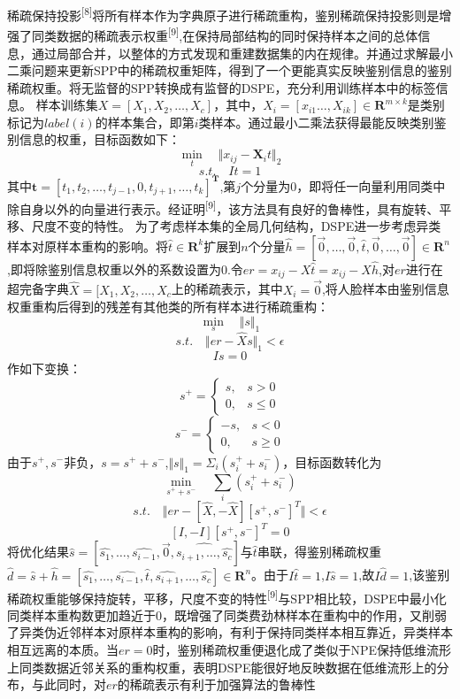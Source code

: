 \documentclass[bachelor,zhspacing]{cqu}  %
\begin{document}
稀疏保持投影\textsuperscript{{[}8{]}}将所有样本作为字典原子进行稀疏重构，鉴别稀疏保持投影则是增强了同类数据的稀疏表示权重\textsuperscript{{[}9{]}},在保持局部结构的同时保持样本之间的总体信息，通过局部合并，以整体的方式发现和重建数据集的内在规律。并通过求解最小二乘问题来更新SPP中的稀疏权重矩阵，得到了一个更能真实反映鉴别信息的鉴别稀疏权重。将无监督的SPP转换成有监督的DSPE，充分利用训练样本中的标签信息。
样本训练集\(X=[X_{1},X_{2},\ldots,X_{c}]\)，其中，\(X_{i}=[x_{i1}\ldots,X_{ik}]\in \mathbf{R}^{m\times k}\)是类别标记为\(label(i)\)的样本集合，即第\(i\)类样本。通过最小二乘法获得最能反映类别鉴别信息的权重，目标函数如下：
\[\min_{t}\quad\Vert x_{ij} - \mathbf{X}_{i}t\Vert_{2}\]
\[s.t.\quad It = 1\]
其中\(\mathbf{t}=[t_{1},t_{2},\ldots,t_{j-1},0,t_{j+1},\ldots,t_{k}]^{\mathbf{T}}\),第\(j\)个分量为0，即将任一向量利用同类中除自身以外的向量进行表示。经证明\textsuperscript{{[}9{]}}，该方法具有良好的鲁棒性，具有旋转、平移、尺度不变的特性。
为了考虑样本集的全局几何结构，DSPE进一步考虑异类样本对原样本重构的影响。将\(\hat{t}\in \mathbf{R}^k\)扩展到\(n\)个分量\(\hat{h}=[\vec{0},\ldots,\vec{0},\hat{t},\vec{0},\ldots,\vec{0}]\in \mathbf{R}^{n}\),即将除鉴别信息权重以外的系数设置为0.令\(er=x_{ij}-X\hat{t}=x_{ij}-X\hat{h}\),对\(er\)进行在超完备字典\(\hat{X}=[X_{1},X_{2},\ldots,X_{c}\)上的稀疏表示，其中\(X_{i}=\vec{0}\),将人脸样本由鉴别信息权重重构后得到的残差有其他类的所有样本进行稀疏重构：
\[\min_{s}\quad\Vert{s}\Vert_{1}\]
\[s.t.\quad\Vert{er-\hat{X}s}\Vert_{1}<\epsilon\] \[Is = 0\]
作如下变换： \[s^{+} = \left\{ 
    \begin{array}{ll}
        s, & s>0\\
        0, & s\le{0}
    \end{array} \right.\] \[s^{-} = \left\{ \begin{array}{ll}
        -s,&s<0\\
        0, &s\ge{0}
        \end{array}\right.\]
由于\(s^{+},s^{-}\)非负，\(s=s^{+}+s^{-}\),\(\Vert{s}\Vert_{1} = \Sigma_{i}(s_{i}^{+}+s_{i}^{-})\)，目标函数转化为
\[\min_{s^{+}+s^{-}}\quad\sum_{i}(s_{i}^{+}+s_{i}^{-})\]
\[s.t.\quad \Vert{er-[\hat{X},-\hat{X}][s^{+},s^{-}]^{T}}\Vert < \epsilon\]
\[[I,-I][s^{+},s^{-}]^{T}=0\]
将优化结果\(\hat{s}=[\hat{s_{1}},\ldots,\hat{s_{i-1}},\vec{0},\hat{s_{i+1},\ldots,\hat{s_{c}}}]\)与\(\hat{t}\)串联，得鉴别稀疏权重\(\hat{d}=\hat{s}+\hat{h}=[\hat{s_{1}},\ldots,\hat{s_{i-1}},\hat{t},\hat{s_{i+1}},\ldots,\hat{s_{c}}]\in \mathbf{R}^{n}\)。由于\(I\hat{t}=1\),\(I\hat{s}=1\),故\(I\hat{d}=1\),该鉴别稀疏权重能够保持旋转，平移，尺度不变的特性\textsuperscript{{[}9{]}}与SPP相比较，DSPE中最小化同类样本重构数更加趋近于0，既增强了同类费劲林样本在重构中的作用，又削弱了异类伪近邻样本对原样本重构的影响，有利于保持同类样本相互靠近，异类样本相互远离的本质。当\(er=0\)时，鉴别稀疏权重便退化成了类似于NPE保持低维流形上同类数据近邻关系的重构权重，表明DSPE能很好地反映数据在低维流形上的分布，与此同时，对\(er\)的稀疏表示有利于加强算法的鲁棒性
\end{document}
